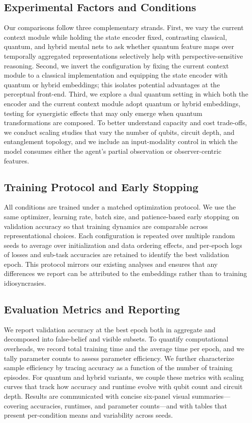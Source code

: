 \subsection{Experimental Factors and Conditions}
Our comparisons follow three complementary strands. First, we vary the current context module while holding the state encoder fixed, contrasting classical, quantum, and hybrid mental nets to ask whether quantum feature maps over temporally aggregated representations selectively help with perspective-sensitive reasoning. Second, we invert the configuration by fixing the current context module to a classical implementation and equipping the state encoder with quantum or hybrid embeddings; this isolates potential advantages at the perceptual front-end. Third, we explore a dual quantum setting in which both the encoder and the current context module adopt quantum or hybrid embeddings, testing for synergistic effects that may only emerge when quantum transformations are composed. To better understand capacity and cost trade-offs, we conduct scaling studies that vary the number of qubits, circuit depth, and entanglement topology, and we include an input-modality control in which the model consumes either the agent’s partial observation or observer-centric features.

\subsection{Training Protocol and Early Stopping}
All conditions are trained under a matched optimization protocol. We use the same optimizer, learning rate, batch size, and patience-based early stopping on validation accuracy so that training dynamics are comparable across representational choices. Each configuration is repeated over multiple random seeds to average over initialization and data ordering effects, and per-epoch logs of losses and sub-task accuracies are retained to identify the best validation epoch. This protocol mirrors our existing analyses and ensures that any differences we report can be attributed to the embeddings rather than to training idiosyncrasies.

\subsection{Evaluation Metrics and Reporting}
We report validation accuracy at the best epoch both in aggregate and decomposed into false-belief and visible subsets. To quantify computational overheads, we record total training time and the average time per epoch, and we tally parameter counts to assess parameter efficiency. We further characterize sample efficiency by tracing accuracy as a function of the number of training episodes. For quantum and hybrid variants, we couple these metrics with scaling curves that track how accuracy and runtime evolve with qubit count and circuit depth. Results are communicated with concise six-panel visual summaries---covering accuracies, runtimes, and parameter counts---and with tables that present per-condition means and variability across seeds.

